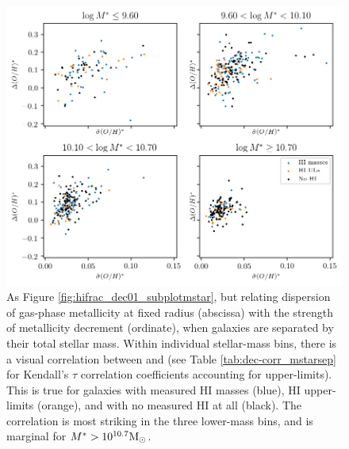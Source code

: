 \begin{figure}
    \centering
    \includegraphics[width=\textwidth]{madoh1_dec01_subplotmstar}
    \caption[As Figure \ref{fig:hifrac_dec01_subplotmstar}, but relating dispersion of gas-phase metallicity at fixed radius with the strength of metallicity decrement.]{As Figure \ref{fig:hifrac_dec01_subplotmstar}, but relating dispersion of gas-phase metallicity at fixed radius (abscissa) with the strength of metallicity decrement (ordinate), when galaxies are separated by their total stellar mass. Within individual stellar-mass bins, there is a visual correlation between \metdisp and \metdec (see Table \ref{tab:dec-corr_mstarsep} for Kendall's $\tau$ correlation coefficients accounting for upper-limits). This is true for galaxies with measured HI masses (blue), HI upper-limits (orange), and with no measured HI at all (black). The correlation is most striking in the three lower-mass bins, and is marginal for $M^* > 10^{10.7} {\rm M_{\odot}}$.}
    \label{fig:madoh1_dec01_subplotmstar}
\end{figure}


